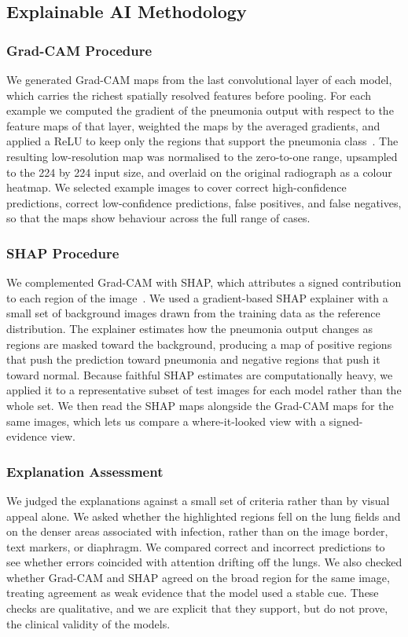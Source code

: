 \documentclass[preprint,12pt]{elsarticle}
\begin{document}
\subsection{Explainable AI Methodology}
\subsubsection{Grad-CAM Procedure}
We generated Grad-CAM maps from the last convolutional layer of each model, which carries the richest spatially resolved features before pooling.
For each example we computed the gradient of the pneumonia output with respect to the feature maps of that layer, weighted the maps by the averaged gradients, and applied a ReLU to keep only the regions that support the pneumonia class~\cite{selvaraju2017gradcam}.
The resulting low-resolution map was normalised to the zero-to-one range, upsampled to the 224 by 224 input size, and overlaid on the original radiograph as a colour heatmap.
We selected example images to cover correct high-confidence predictions, correct low-confidence predictions, false positives, and false negatives, so that the maps show behaviour across the full range of cases.

\subsubsection{SHAP Procedure}
We complemented Grad-CAM with SHAP, which attributes a signed contribution to each region of the image~\cite{lundberg2017unified}.
We used a gradient-based SHAP explainer with a small set of background images drawn from the training data as the reference distribution.
The explainer estimates how the pneumonia output changes as regions are masked toward the background, producing a map of positive regions that push the prediction toward pneumonia and negative regions that push it toward normal.
Because faithful SHAP estimates are computationally heavy, we applied it to a representative subset of test images for each model rather than the whole set.
We then read the SHAP maps alongside the Grad-CAM maps for the same images, which lets us compare a where-it-looked view with a signed-evidence view.

\subsubsection{Explanation Assessment}
We judged the explanations against a small set of criteria rather than by visual appeal alone.
We asked whether the highlighted regions fell on the lung fields and on the denser areas associated with infection, rather than on the image border, text markers, or diaphragm.
We compared correct and incorrect predictions to see whether errors coincided with attention drifting off the lungs.
We also checked whether Grad-CAM and SHAP agreed on the broad region for the same image, treating agreement as weak evidence that the model used a stable cue.
These checks are qualitative, and we are explicit that they support, but do not prove, the clinical validity of the models.
\end{document}
